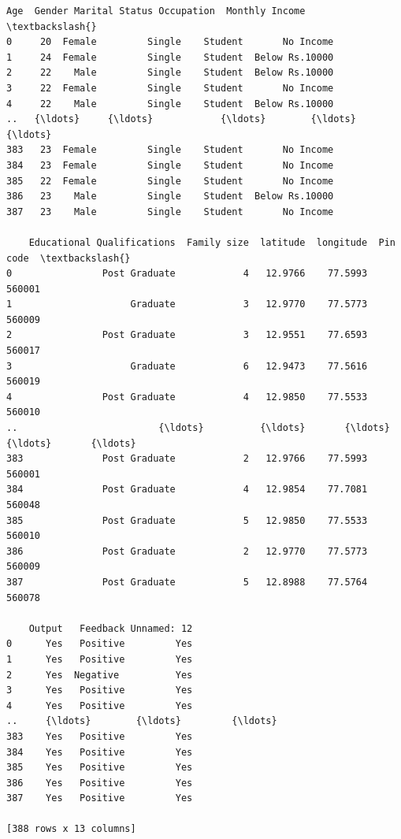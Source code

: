 \documentclass[11pt]{article}
\makeatletter
\newcommand{\boxspacing}{\kern\kvtcb@left@rule\kern\kvtcb@boxsep}
\newcommand{\prompt}[4]{
        {\ttfamily\llap{{\color{#2}[#3]:\hspace{3pt}#4}}\vspace{-\baselineskip}}
    }
\makeatother
\begin{document}
            \begin{tcolorbox}[breakable, size=fbox, boxrule=.5pt, pad at break*=1mm, opacityfill=0]
\prompt{Out}{outcolor}{18}{\boxspacing}
\begin{Verbatim}[commandchars=\\\{\}]
     Age  Gender Marital Status Occupation  Monthly Income  \textbackslash{}
0     20  Female         Single    Student       No Income
1     24  Female         Single    Student  Below Rs.10000
2     22    Male         Single    Student  Below Rs.10000
3     22  Female         Single    Student       No Income
4     22    Male         Single    Student  Below Rs.10000
..   {\ldots}     {\ldots}            {\ldots}        {\ldots}             {\ldots}
383   23  Female         Single    Student       No Income
384   23  Female         Single    Student       No Income
385   22  Female         Single    Student       No Income
386   23    Male         Single    Student  Below Rs.10000
387   23    Male         Single    Student       No Income

    Educational Qualifications  Family size  latitude  longitude  Pin code  \textbackslash{}
0                Post Graduate            4   12.9766    77.5993    560001
1                     Graduate            3   12.9770    77.5773    560009
2                Post Graduate            3   12.9551    77.6593    560017
3                     Graduate            6   12.9473    77.5616    560019
4                Post Graduate            4   12.9850    77.5533    560010
..                         {\ldots}          {\ldots}       {\ldots}        {\ldots}       {\ldots}
383              Post Graduate            2   12.9766    77.5993    560001
384              Post Graduate            4   12.9854    77.7081    560048
385              Post Graduate            5   12.9850    77.5533    560010
386              Post Graduate            2   12.9770    77.5773    560009
387              Post Graduate            5   12.8988    77.5764    560078

    Output   Feedback Unnamed: 12
0      Yes   Positive         Yes
1      Yes   Positive         Yes
2      Yes  Negative          Yes
3      Yes   Positive         Yes
4      Yes   Positive         Yes
..     {\ldots}        {\ldots}         {\ldots}
383    Yes   Positive         Yes
384    Yes   Positive         Yes
385    Yes   Positive         Yes
386    Yes   Positive         Yes
387    Yes   Positive         Yes

[388 rows x 13 columns]
\end{Verbatim}
\end{tcolorbox}
        
\end{document}
